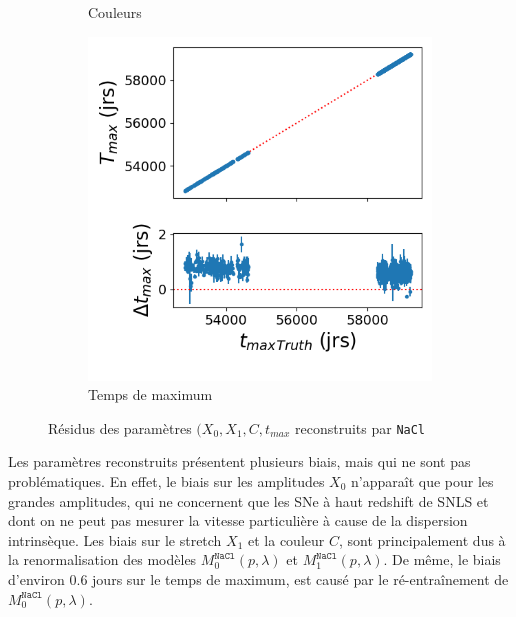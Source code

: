 \documentclass{book}
\def\nacl{\texttt{NaCl}\xspace}
\begin{document}
\begin{figure}[h]
\begin{subfigure}{0.45\textwidth}
		\caption{Couleurs}
		\label{fig:nacl_c}
	\end{subfigure}
	\hfill
	\begin{subfigure}{0.45\textwidth}
		\centering
		\includegraphics[width=\textwidth]{figures/nacl_tmax.png}
		\caption{Temps de maximum }
		\label{fig:nacl_tmax}
	\end{subfigure}
	\caption{Résidus des paramètres $(X_0, X_1, C, t_{max}$ reconstruits par \nacl}
	\label{fig:nacl_residuals}
\end{figure}

Les paramètres reconstruits présentent plusieurs biais, mais qui ne sont pas problématiques. En effet, le biais sur les amplitudes $X_0$ n'apparaît que pour les grandes amplitudes, qui ne concernent que les SNe à haut redshift de SNLS et dont on ne peut pas mesurer la vitesse particulière à cause de la dispersion intrinsèque. Les biais sur le stretch $X_1$ et la couleur $C$, sont principalement dus à la renormalisation des modèles $M_0^{\nacl}(p, \lambda)$ et $M_1^{\nacl}(p,\lambda)$. De même, le biais d'environ $0.6$ jours sur le temps de maximum, est causé par le ré-entraînement de $M_0^{\nacl}(p, \lambda)$.
\end{document}
